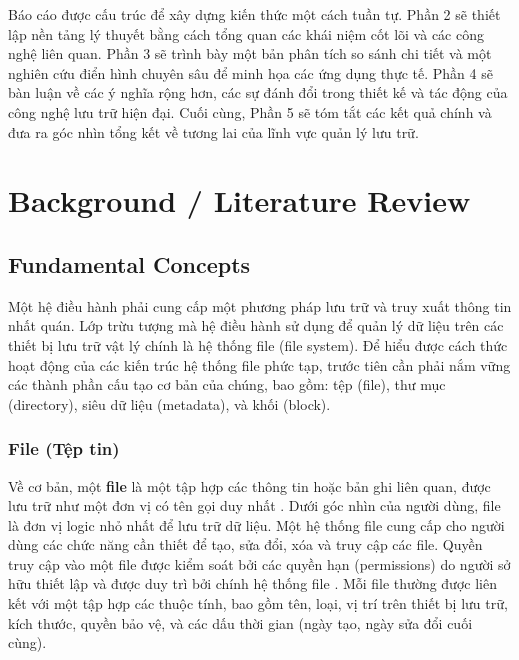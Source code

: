 \documentclass[12pt]{article}
\begin{document}
Báo cáo được cấu trúc để xây dựng kiến thức một cách tuần tự. Phần 2 sẽ thiết lập nền tảng lý thuyết bằng cách tổng quan các khái niệm cốt lõi và các công nghệ liên quan. Phần 3 sẽ trình bày một bản phân tích so sánh chi tiết và một nghiên cứu điển hình chuyên sâu để minh họa các ứng dụng thực tế. Phần 4 sẽ bàn luận về các ý nghĩa rộng hơn, các sự đánh đổi trong thiết kế và tác động của công nghệ lưu trữ hiện đại. Cuối cùng, Phần 5 sẽ tóm tắt các kết quả chính và đưa ra góc nhìn tổng kết về tương lai của lĩnh vực quản lý lưu trữ.

\section{Background / Literature Review}

\subsection{Fundamental Concepts}

Một hệ điều hành phải cung cấp một phương pháp lưu trữ và truy xuất thông tin nhất quán. Lớp trừu tượng mà hệ điều hành sử dụng để quản lý dữ liệu trên các thiết bị lưu trữ vật lý chính là hệ thống file (file system). Để hiểu được cách thức hoạt động của các kiến trúc hệ thống file phức tạp, trước tiên cần phải nắm vững các thành phần cấu tạo cơ bản của chúng, bao gồm: tệp (file), thư mục (directory), siêu dữ liệu (metadata), và khối (block).

\subsubsection{File (Tệp tin)}
Về cơ bản, một \textbf{file} là một tập hợp các thông tin hoặc bản ghi liên quan, được lưu trữ như một đơn vị có tên gọi duy nhất \parencite{EMC2012InformationStorage}. Dưới góc nhìn của người dùng, file là đơn vị logic nhỏ nhất để lưu trữ dữ liệu. Một hệ thống file cung cấp cho người dùng các chức năng cần thiết để tạo, sửa đổi, xóa và truy cập các file. Quyền truy cập vào một file được kiểm soát bởi các quyền hạn (permissions) do người sở hữu thiết lập và được duy trì bởi chính hệ thống file \parencite{Silberschatz2018}. Mỗi file thường được liên kết với một tập hợp các thuộc tính, bao gồm tên, loại, vị trí trên thiết bị lưu trữ, kích thước, quyền bảo vệ, và các dấu thời gian (ngày tạo, ngày sửa đổi cuối cùng).
\end{document}
